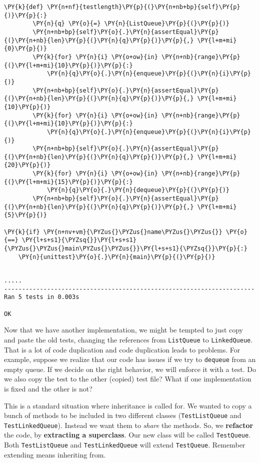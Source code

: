\begin{Verbatim}[commandchars=\\\{\}]
    \PY{k}{def} \PY{n+nf}{testlength}\PY{p}{(}\PY{n+nb+bp}{self}\PY{p}{)}\PY{p}{:}
        \PY{n}{q} \PY{o}{=} \PY{n}{ListQueue}\PY{p}{(}\PY{p}{)}
        \PY{n+nb+bp}{self}\PY{o}{.}\PY{n}{assertEqual}\PY{p}{(}\PY{n+nb}{len}\PY{p}{(}\PY{n}{q}\PY{p}{)}\PY{p}{,} \PY{l+m+mi}{0}\PY{p}{)}
        \PY{k}{for} \PY{n}{i} \PY{o+ow}{in} \PY{n+nb}{range}\PY{p}{(}\PY{l+m+mi}{10}\PY{p}{)}\PY{p}{:}
            \PY{n}{q}\PY{o}{.}\PY{n}{enqueue}\PY{p}{(}\PY{n}{i}\PY{p}{)}
        \PY{n+nb+bp}{self}\PY{o}{.}\PY{n}{assertEqual}\PY{p}{(}\PY{n+nb}{len}\PY{p}{(}\PY{n}{q}\PY{p}{)}\PY{p}{,} \PY{l+m+mi}{10}\PY{p}{)}
        \PY{k}{for} \PY{n}{i} \PY{o+ow}{in} \PY{n+nb}{range}\PY{p}{(}\PY{l+m+mi}{10}\PY{p}{)}\PY{p}{:}
            \PY{n}{q}\PY{o}{.}\PY{n}{enqueue}\PY{p}{(}\PY{n}{i}\PY{p}{)}
        \PY{n+nb+bp}{self}\PY{o}{.}\PY{n}{assertEqual}\PY{p}{(}\PY{n+nb}{len}\PY{p}{(}\PY{n}{q}\PY{p}{)}\PY{p}{,} \PY{l+m+mi}{20}\PY{p}{)}
        \PY{k}{for} \PY{n}{i} \PY{o+ow}{in} \PY{n+nb}{range}\PY{p}{(}\PY{l+m+mi}{15}\PY{p}{)}\PY{p}{:}
            \PY{n}{q}\PY{o}{.}\PY{n}{dequeue}\PY{p}{(}\PY{p}{)}
        \PY{n+nb+bp}{self}\PY{o}{.}\PY{n}{assertEqual}\PY{p}{(}\PY{n+nb}{len}\PY{p}{(}\PY{n}{q}\PY{p}{)}\PY{p}{,} \PY{l+m+mi}{5}\PY{p}{)}

\PY{k}{if} \PY{n+nv+vm}{\PYZus{}\PYZus{}name\PYZus{}\PYZus{}} \PY{o}{==} \PY{l+s+s1}{\PYZsq{}}\PY{l+s+s1}{\PYZus{}\PYZus{}main\PYZus{}\PYZus{}}\PY{l+s+s1}{\PYZsq{}}\PY{p}{:}
    \PY{n}{unittest}\PY{o}{.}\PY{n}{main}\PY{p}{(}\PY{p}{)}
\end{Verbatim}

\begin{Verbatim}

.....
----------------------------------------------------------------------
Ran 5 tests in 0.003s

OK

\end{Verbatim}


Now that we have another implementation, we might be tempted to just copy and paste the old tests, changing the references from \texttt{ListQueue} to \texttt{LinkedQueue}.
That is a lot of code duplication and code duplication leads to problems.
For example, suppose we realize that our code has issues if we try to \texttt{dequeue} from an empty queue.
If we decide on the right behavior, we will enforce it with a test.
Do we also copy the test to the other (copied) test file?
What if one implementation is fixed and the other is not?


This is a standard situation where inheritance is called for.
We wanted to copy a bunch of methods to be included in two different classes (\texttt{TestListQueue} and \texttt{TestLinkedQueue}).
Instead we want them to \emph{share} the methods.
So, we \textbf{refactor} the code, by \textbf{extracting a superclass}.
Our new class will be called \texttt{TestQueue}.
Both \texttt{TestListQueue} and \texttt{TestLinkedQueue} will extend \texttt{TestQueue}.
Remember extending means inheriting from.

